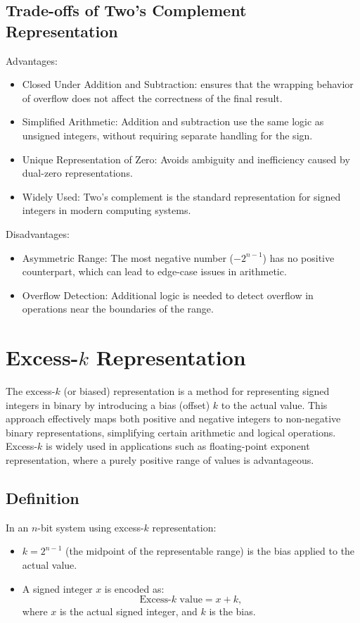 \subsection{Trade-offs of Two's Complement Representation}
Advantages:
\begin{itemize}
    \item Closed Under Addition and Subtraction: ensures that the wrapping behavior of overflow does not affect the correctness of the final result.
    \item Simplified Arithmetic: Addition and subtraction use the same logic as unsigned integers, without requiring separate handling for the sign.
    \item Unique Representation of Zero: Avoids ambiguity and inefficiency caused by dual-zero representations.
    \item Widely Used: Two's complement is the standard representation for signed integers in modern computing systems.
\end{itemize}

Disadvantages:
\begin{itemize}
    \item Asymmetric Range: The most negative number (\( -2^{n-1} \)) has no positive counterpart, which can lead to edge-case issues in arithmetic.
    \item Overflow Detection: Additional logic is needed to detect overflow in operations near the boundaries of the range.
\end{itemize}


\section{Excess-\( k \) Representation}
The excess-\( k \) (or biased) representation is a method for representing signed integers in binary by introducing a bias (offset) \( k \) to the actual value. This approach effectively maps both positive and negative integers to non-negative binary representations, simplifying certain arithmetic and logical operations. Excess-\( k \) is widely used in applications such as floating-point exponent representation, where a purely positive range of values is advantageous.

\subsection{Definition}
In an \( n \)-bit system using excess-\( k \) representation:
\begin{itemize}
    \item \( k = 2^{n-1} \) (the midpoint of the representable range) is the bias applied to the actual value.
    \item A signed integer \( x \) is encoded as:
    \[
    \text{Excess-} k \text{ value} = x + k,
    \]
    where \( x \) is the actual signed integer, and \( k \) is the bias.
\end{itemize}

